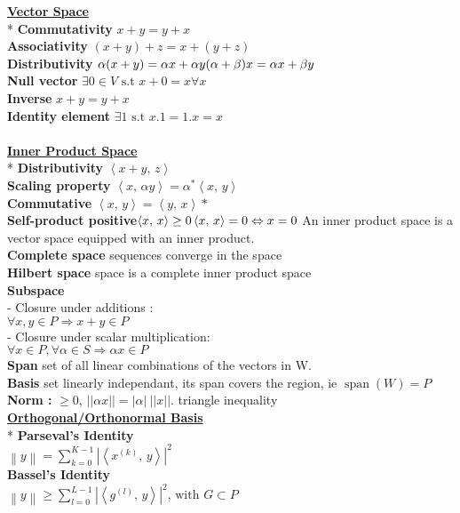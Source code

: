 \documentclass{article}
\newcommand{\ip}[2]{\left \langle #1, \, #2 \right \rangle} %
\newcommand{\para}[1]{\textbf{\underline{#1}}\\*} %
\newcommand{\subpara}[1]{\textbf{#1}}
\begin{document}
\begin{multicols}{3}
\para{Vector Space} 
\subpara{Commutativity} $x+y = y+x$\\
\subpara{Associativity} $(x+y) + z = x + (y+z)$\\
\subpara{Distributivity} $\alpha(x+y) = \alpha x+\alpha y \\ (\alpha + \beta) x = \alpha x + \beta y$\\
\subpara{Null vector} $\exists 0 \in V \text{ s.t } x+0 = x \forall x$\\
\subpara{Inverse} $x+y = y+x$\\
\subpara{Identity element} $\exists 1\text{ s.t } x.1= 1.x=x$\\
\\
\para{Inner Product Space} 
\subpara{Distributivity} $\ip{x+y}{z}$\\
\subpara{Scaling property} $\ip{x}{\alpha y} = \alpha^*\ip{x}{y} $\\
\subpara{Commutative} $\ip{x}{y} = \ip{y}{x}*$\\
\subpara{Self-product positive}$\ip xx \geq 0 \\ \ip xx =0  \Leftrightarrow x= 0$
An inner product space is a vector space equipped with an inner product. \\
\subpara{Complete space} sequences converge in the space\\
\subpara{Hilbert space} space is a complete inner product space \\
\subpara{Subspace} \\
- Closure under additions :\\ $ \forall x,y \in P \Rightarrow x + y \in P$\\
- Closure under scalar multiplication: \\
$\forall x \in P, \forall \alpha \in S \Rightarrow \alpha x \in P $
\\ \subpara{Span} set of all linear combinations of the vectors in W. \\
\subpara{Basis} set linearly independant, its span covers the region, ie $\operatorname{span}(W) = P$\\
\subpara{Norm :} $\geq 0$, $||\alpha x|| = |\alpha|\ ||x||$. triangle inequality \\
%
\para{Orthogonal/Orthonormal Basis}
\subpara{Parseval's Identity} \\ $\left \| y \right \| = \displaystyle\sum_{k=0}^{K-1}\left | \ip{x^{(k)}}y \right | ^2$
\\ \subpara{Bassel's Identity}\\ $\left \| y \right \| \geq \displaystyle\sum_{l=0}^{L-1}\left | \ip{g^{(l)}}y \right | ^2 \text{, with } G \subset P$

\end{multicols}
\end{document}
